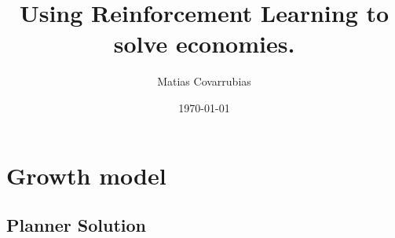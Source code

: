 \documentclass[11pt]{article}
\numberwithin{equation}{section}
\begin{document}
\title{Using Reinforcement Learning to solve economies.}

\author{Matias Covarrubias}

\medskip

\date{\today}

\thispagestyle{empty}



\newpage

\section{Growth model}

\subsection{Planner Solution}
\end{document}
